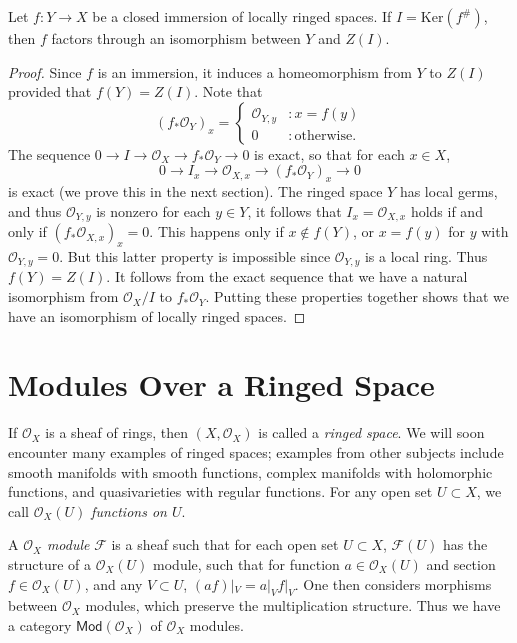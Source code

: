 \begin{lemma}
    Let $f: Y \to X$ be a closed immersion of locally ringed spaces. If $I = \text{Ker}(f^\#)$, then $f$ factors through an isomorphism between $Y$ and $Z(I)$.
\end{lemma}
\begin{proof}
    Since $f$ is an immersion, it induces a homeomorphism from $Y$ to $Z(I)$ provided that $f(Y) = Z(I)$. Note that
    \[ (f_* \mathcal{O}_Y)_x = \begin{cases} \mathcal{O}_{Y,y} &: x = f(y) \\ 0 &: \text{otherwise}. \end{cases} \]
    The sequence $0 \to I \to \mathcal{O}_X \to f_* \mathcal{O}_Y \to 0$ is exact, so that for each $x \in X$,
    \[ 0 \to I_x \to \mathcal{O}_{X,x} \to (f_* \mathcal{O}_Y)_x \to 0 \]
    is exact (we prove this in the next section). The ringed space $Y$ has local germs, and thus $\mathcal{O}_{Y,y}$ is nonzero for each $y \in Y$, it follows that $I_x = \mathcal{O}_{X,x}$ holds if and only if $(f_* \mathcal{O}_{X,x})_x = 0$. This happens only if $x \not \in f(Y)$, or $x = f(y)$ for $y$ with $\mathcal{O}_{Y,y} = 0$. But this latter property is impossible since $\mathcal{O}_{Y,y}$ is a local ring. Thus $f(Y) = Z(I)$. It follows from the exact sequence that we have a natural isomorphism from $\mathcal{O}_X / I$ to $f_* \mathcal{O}_Y$. Putting these properties together shows that we have an isomorphism of locally ringed spaces.
\end{proof}

\section{Modules Over a Ringed Space}

If $\mathcal{O}_X$ is a sheaf of rings, then $(X,\mathcal{O}_X)$ is called a \emph{ringed space}. We will soon encounter many examples of ringed spaces; examples from other subjects include smooth manifolds with smooth functions, complex manifolds with holomorphic functions, and quasivarieties with regular functions. For any open set $U \subset X$, we call $\mathcal{O}_X(U)$ \emph{functions on $U$}.

A \emph{$\mathcal{O}_X$ module} $\mathcal{F}$ is a sheaf such that for each open set $U \subset X$, $\mathcal{F}(U)$ has the structure of a $\mathcal{O}_X(U)$ module, such that for function $a \in \mathcal{O}_X(U)$ and section $f \in \mathcal{O}_X(U)$, and any $V \subset U$, $(af)|_V = a|_V f|_V$. One then considers morphisms between $\mathcal{O}_X$ modules, which preserve the multiplication structure. Thus we have a category $\mathsf{Mod}(\mathcal{O}_X)$ of $\mathcal{O}_X$ modules.

